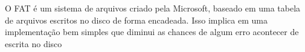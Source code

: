 \begin{question}

	O FAT é um sistema de arquivos criado pela Microsoft, baseado em uma 
	tabela de arquivos escritos no disco de forma encadeada. Isso implica em uma implementação bem simples 
	que diminui as chances de algum erro acontecer de escrita no disco

\end{question}